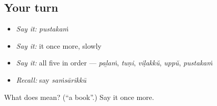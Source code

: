 \subsection*{Your turn}
\begin{itemize}
\raggedright
  \item \emph{Say it:} \emph{pustakaṁ}
  \item \emph{Say it:} it once more, slowly
  \item \emph{Say it:} all five in order — \emph{paḻaṁ}, \emph{tuṇi}, \emph{viḷakkŭ}, \emph{uppŭ}, \emph{pustakaṁ}
  \item \emph{Recall:} say \emph{saṁsārikkū}
\end{itemize}

\begin{tcolorbox}[breakable,colback=teal!4,colframe=teal!35!black,title={Before you move on}]
What does  mean? (\textquotedblleft{}a book\textquotedblright{}.) Say it once more.
\end{tcolorbox}
